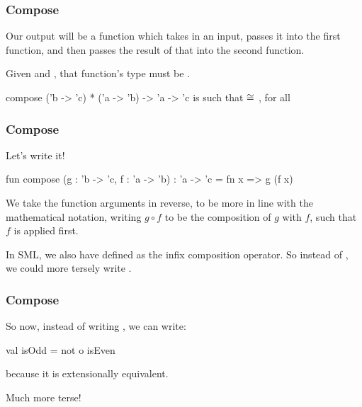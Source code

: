 \documentclass[aspectratio=169]{beamer}
\begin{document}
\begin{frame}[fragile]
  \frametitle{Compose}

  Our output will be a function which takes in an input, passes it into the
  first function, and then passes the result of that into the second function.

  \pause
  \vspace{\fill}

  Given  and , that function's type must be
  .

  \spec
    {compose}
    {('b -> 'c) * ('a -> 'b) -> 'a -> 'c}
    {}
    { is such that  $\cong$ , for all }
\end{frame}

\begin{frame}[fragile]
  \frametitle{Compose}

  Let's write it!

  \pause
  \vspace{\fill}

  \begin{codeblock}
    fun compose (g : 'b -> 'c, f : 'a -> 'b) : 'a -> 'c =
      fn x => g (f x)
  \end{codeblock}

  \pause
  \vspace{\fill}

  We take the function arguments in reverse, to be more in line with the
  mathematical notation, writing $g \circ f$ to be the composition of $g$
  with $f$, such that $f$ is applied first.

  \pause
  \vspace{\fill}

  In SML, we also have  defined as the infix composition operator. So
  instead of , we could more tersely write .
\end{frame}

\begin{frame}[fragile]
  \frametitle{Compose}

  So now, instead of writing , we can write:

  \pause
  \vspace{\fill}

  \begin{codeblock}
    val isOdd = not o isEven
  \end{codeblock}
  because it is extensionally equivalent.

  \pause
  \vspace{\fill}

  Much more terse!
\end{frame}
\end{document}
